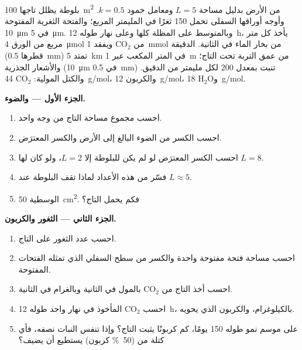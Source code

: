 \begin{problem}
\label{pb:b1:flowering-plant-organization:1}
بلوطة يظلل تاجها \qty{100}{m^2} من الأرض بدليل مساحة  $L = 5$
ومعامل خمود $k = 0.5$. وأوجه أوراقها السفلى تحمل \qty{150}{} ثغرًا
في المليمتر المربع؛ والفتحة الثغرية المفتوحة \qty{10}{\micro m} في
\qty{5}{\micro m}. وبالمتوسط على المظلة كلها وعلى نهار طوله
\qty{12}{h}، يأخذ كل متر مربع من الورق \qty{4}{\micro mol} من
$\mathrm{CO_2}$ ويفقد \qty{1}{mmol} من بخار الماء في الثانية.
 الدقيقة (قطرها \qty{0.5}{mm}) تمتد \qty{5}{km} في المتر
المكعب عبر \qty{1}{m} من عمق التربة تحت التاج؛ والأشعار الجذرية
(\qty{10}{\micro m} في \qty{0.5}{mm}) تنبت بمعدل \qty{200}{} لكل
مليمتر من  الدقيق. والكتل المولية: $\mathrm{CO_2}$
\qty{44}{g/mol}، والكربون \qty{12}{g/mol}، و$\mathrm{H_2O}$
\qty{18}{g/mol}.

\medskip
\noindent\textbf{الجزء الأول ---  والضوء.}
\begin{enumerate}
  \item احسب مجموع مساحة  التاج من وجه واحد.
  \item احسب الكسر من الضوء البالغ إلى الأرض والكسر المعترَض.
  \item احسب الكسر المعترَض لو لم يكن للبلوطة إلا $L = 2$، ولو كان
        لها $L = 8$.
  \item فسّر من هذه الأعداد لماذا تقف البلوطة عند $L \approx 5$.
  \item {} الوسطية \qty{50}{cm^2}. فكم  يحمل التاج؟
\end{enumerate}

\medskip
\noindent\textbf{الجزء الثاني --- الثغور والكربون.}
\begin{enumerate}[resume]
  \item احسب عدد الثغور على التاج.
  \item احسب مساحة فتحة مفتوحة واحدة والكسر من سطح  السفلي
        الذي تمثله الفتحات المفتوحة.
  \item احسب أخذ التاج من $\mathrm{CO_2}$ بالمول في الثانية
        وبالغرام في الثانية.
  \item احسب $\mathrm{CO_2}$ المأخوذ في نهار واحد طوله \qty{12}{h}،
        بالكيلوغرام، والكربون الذي يحويه.
  \item على موسم نمو طوله \qty{150}{} يومًا، كم كربونًا يثبت التاج؟
        وإذا تنفس النبات نصفه، فأي كتلة من  (\qty{50}{\%}
        كربون) يستطيع أن يضيف؟
\end{enumerate}


\end{problem}
